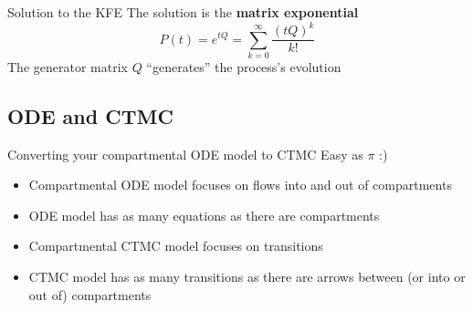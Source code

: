 \documentclass[aspectratio=169]{beamer}\usepackage[]{graphicx}\usepackage[]{xcolor}
\begin{document}
\begin{frame}{Solution to the KFE}
        The solution is the \textbf{matrix exponential}
        $$ P(t) = e^{tQ} = \sum_{k=0}^{\infty} \frac{(tQ)^k}{k!} $$
        \vfill
        The generator matrix $Q$ ``generates'' the process's evolution
\end{frame}


%     
%     
%     



\subsection{ODE and CTMC}


\begin{frame}{Converting your compartmental ODE model to CTMC}
    Easy as $\pi$ :)
\vfill
\begin{itemize}
    \item Compartmental ODE model focuses on flows into and out of compartments
    \vfill
    \item ODE model has as many equations as there are compartments
    \vfill
    \item Compartmental CTMC model focuses on transitions
    \vfill
    \item CTMC model has as many transitions as there are arrows between (or into or out of) compartments
\end{itemize}
\end{frame}
\end{document}
